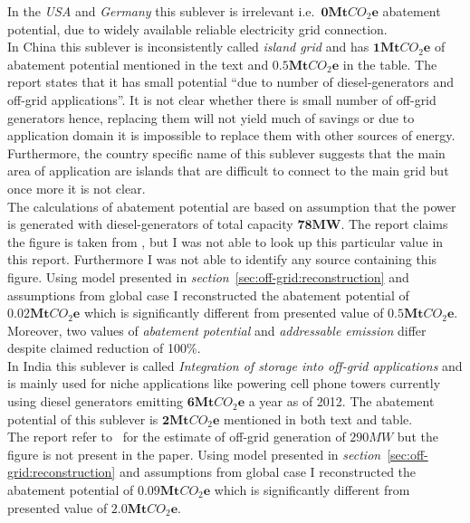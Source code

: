 \documentclass[11pt, twocolumn]{article}
\begin{document}
In the \emph{USA} and \emph{Germany} this sublever is irrelevant i.e.\ $\mathbf{0} \mathbf{Mt}CO_2\mathbf{e}$ abatement potential, due to widely available reliable electricity grid connection.\\

In China this sublever is inconsistently called \emph{island grid} and has $\mathbf{1} \mathbf{Mt}CO_2\mathbf{e}$ of abatement potential mentioned in the text and $\mathbf{0.5} \mathbf{Mt}CO_2\mathbf{e}$ in the table. The report states that it has small potential ``due to number of diesel-generators and off-grid applications''. It is not clear whether there is small number of off-grid generators hence, replacing them will not yield much of savings or due to application domain it is impossible to replace them with other sources of energy.\\
Furthermore, the country specific name of this sublever suggests that the main area of application are islands that are difficult to connect to the main grid but once more it is not clear.\\
The calculations of abatement potential are based on assumption that the power is generated with diesel-generators of total capacity $\mathbf{78} \mathbf{MW}$. The report claims the figure is taken from \citep{pieper2011revisiting}, but I was not able to look up this particular value in this report. Furthermore I was not able to identify any source containing this figure. Using model presented in \emph{section}~\ref{sec:off-grid:reconstruction} and assumptions from global case I reconstructed the abatement potential of $\mathbf{0.02} \mathbf{Mt}CO_2\mathbf{e}$ which is significantly different from presented value of $\mathbf{0.5} \mathbf{Mt}CO_2\mathbf{e}$. Moreover, two values of \emph{abatement potential} and \emph{addressable emission} differ despite claimed reduction of 100\%.\\

In India this sublever is called \emph{Integration of storage into off-grid applications} and is mainly used for niche applications like powering cell phone towers currently using diesel generators emitting $\mathbf{6} \mathbf{Mt}CO_2\mathbf{e}$ a year as of 2012. The abatement potential of this sublever is $\mathbf{2} \mathbf{Mt}CO_2\mathbf{e}$ mentioned in both text and table.\\
The report refer to~\citep{pieper2011revisiting} for the estimate of off-grid generation of $290MW$ but the figure is not present in the paper. Using model presented in \emph{section}~\ref{sec:off-grid:reconstruction} and assumptions from global case I reconstructed the abatement potential of $\mathbf{0.09} \mathbf{Mt}CO_2\mathbf{e}$ which is significantly different from presented value of $\mathbf{2.0} \mathbf{Mt}CO_2\mathbf{e}$.
\end{document}
